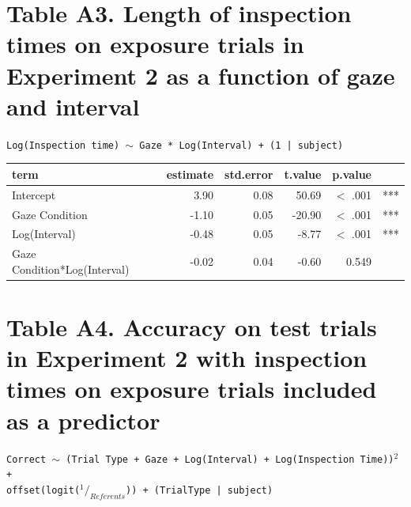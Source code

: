 \documentclass[authoryear, review]{elsarticle}
\begin{document}
\newpage

\section*{Table A3. Length of inspection times on exposure trials in Experiment 2 as a function of gaze and interval}

\texttt{Log(Inspection time) $\sim$ Gaze * Log(Interval) + (1 | subject)}

\begin{table}[h]
\centering
\begin{tabular}{lrrrrl}
 term & estimate & std.error & t.value & p.value &  \\ 
  \hline
Intercept & 3.90 & 0.08 & 50.69 & $<$ .001 & *** \\ 
  Gaze Condition & -1.10 & 0.05 & -20.90 & $<$ .001 & *** \\ 
  Log(Interval) & -0.48 & 0.05 & -8.77 & $<$ .001 & *** \\ 
  Gaze Condition*Log(Interval) & -0.02 & 0.04 & -0.60 & 0.549 &  \\ 
   \hline
\end{tabular}
\label{tab:e2_rt}
\end{table}

\section*{Table A4. Accuracy on test trials in Experiment 2 with inspection times on exposure trials included as a predictor}

\texttt{Correct $\sim$ (Trial Type + Gaze + Log(Interval) + Log(Inspection Time))$^2$ + \\ offset(logit($^1/_{Referents}$)) + (TrialType | subject)}
\end{document}
